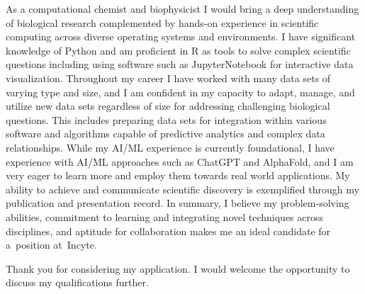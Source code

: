\documentclass[11pt, a4paper]{awesome-cv}
\newcommand{\companyname}{Incyte}
\newcommand{\role}{BIS AI/ML Data Engineer--DERM}
\newcommand{\brole}{\textbf{\role}}
\begin{document}
\begin{cvletter}
		
		As a computational chemist and biophysicist I would bring a deep understanding of biological research complemented by hands-on experience in scientific computing across diverse operating systems and environments. %
		I have significant knowledge of Python and am proficient in R as tools to solve complex scientific questions including using software such as JupyterNotebook for interactive data visualization.
		Throughout my career I have worked with many data sets of varying type and size, and I am confident in my capacity to adapt, manage, and utilize new data sets regardless of size for addressing challenging biological questions. This includes preparing data sets for integration within various software and algorithms capable of predictive analytics and complex data relationships.
		While my AI/ML experience is currently foundational, I have experience with AI/ML approaches such as ChatGPT and AlphaFold, and I am  very eager to learn more and employ them towards real world applications.
		My ability to achieve and communicate scientific discovery is exemplified through my publication and presentation record.
		In summary, I believe my problem-solving abilities, commitment to learning and integrating novel techniques across disciplines, and aptitude for collaboration makes me an ideal candidate for a~position at~\companyname.
		
	\end{cvletter}

	Thank you for considering my application. I would welcome the opportunity to discuss my qualifications further.
	
	\makeletterclosing
\end{document}
